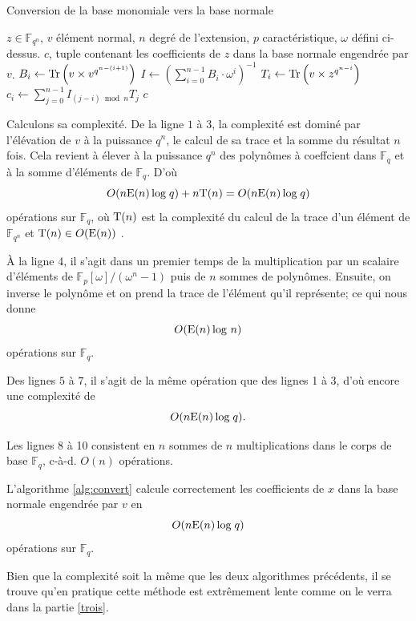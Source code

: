 \documentclass[a4paper]{article} %
\numberwithin{section}{part}
\numberwithin{equation}{section}
\newcommand\GF[1]{\mathbb{F}_{#1}}
\newcommand\Tr[1]{\textup{Tr}\left(#1\right)}
\newcommand\E[1]{\textup{E}(#1)}
\begin{document}
\begin{algorithm}
\caption{Conversion de la base monomiale vers la base normale}
\label{alg:convert}
\begin{algorithmic}[1]
\REQUIRE $z\in\GF{q^n}$, $v$ élément normal, $n$ degré de l'extension, $p$ 
caractéristique, $\omega$ défini ci-dessus.
\ENSURE $c$, tuple contenant les coefficients de $z$ dans la base 
normale engendrée par $v$.
\bigskip
{}
    \STATE $B_i \leftarrow \Tr{v\times v^{q^{n-(i+1)}}}$
\ENDFOR
\STATE $I \leftarrow (\sum_{i = 0}^{n-1}{B_i\cdot \omega^i})^{-1}$
    \STATE $T_i \leftarrow \Tr{v\times z^{q^{n-i}}}$
\ENDFOR
{}
    \STATE $c_i \leftarrow \sum_{j=0}^{n-1}{I_{(j-i)\bmod n}T_j}$
\ENDFOR
\RETURN $c$

\end{algorithmic}
\end{algorithm}
Calculons sa complexité. De la ligne $1$ à $3$, la complexité est dominé par 
l'élévation de $v$ à la puissance $q^n$, le calcul de sa trace et la somme du 
résultat $n$ fois. Cela revient à élever à la puissance $q^n$ des polynômes à 
coeffcient dans $\GF{q}$ et à la somme d'éléments de $\GF{q}$. D'où 
\begin{equation}
O(n\E{n}\,\textup{log}\;q) + n\textup{T}(n) = O(n\E{n}\,\textup{log}\;q) 
\end{equation}
opérations sur $\GF{q}$, où $\textup{T}(n)$ est la complexité du calcul de la 
trace d'un élément de $\GF{q^n}$ et $\textup{T}(n) \in O(\E{n})$ \cite[th.
7.9]{GaSho}.\par
À la ligne $4$, il s'agit dans un premier temps de la multiplication par un 
scalaire d'éléments de $\mathbb{F}_p[\omega]/(\omega^n - 1)$ puis de $n$ sommes 
de polynômes. Ensuite, on inverse le polynôme et on prend la trace de l'élément 
qu'il représente; ce qui nous donne 
\begin{equation}
O(\E{n}\,\textup{log }n)
\end{equation}
opérations sur $\GF{q}$.\par
Des lignes $5$ à $7$, il s'agit de la même opération que des lignes 1 à 3, d'où 
encore une complexité de 
\begin{equation}
O(n\E{n}\,\textup{log}\;q).
\end{equation}

Les lignes 8 à 10 consistent en $n$ sommes de $n$ multiplications dans le corps 
de base $\GF{q}$, c-à-d. $O(n)$ opérations.\par
\begin{prop}
\label{prop:algconvert}
L'algorithme \ref{alg:convert} calcule correctement les coefficients de $x$ dans
la base normale engendrée par $v$ en
\begin{equation}
O(n\E{n}\,\textup{log}\;q)
\end{equation}
opérations sur $\GF{q}$.
\end{prop}
\begin{rem}
Bien que la complexité soit la même que les deux algorithmes précédents, il se
trouve qu'en pratique cette méthode est extrêmement lente comme on le verra dans
la partie \ref{trois}.
\end{rem}
\end{document}
